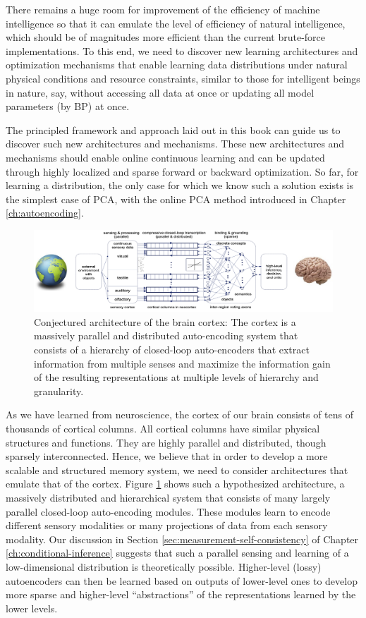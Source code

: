\documentclass[../../book-main.tex]{subfiles}
\begin{document}
There remains a huge room for  improvement of the efficiency of   machine intelligence so that it can emulate the level of efficiency of natural intelligence, which should be of magnitudes more efficient than the current brute-force implementations. To this end, we need to discover new learning architectures and optimization mechanisms that enable learning data distributions under natural physical conditions and resource constraints, similar to those for intelligent beings in nature, say, without accessing all data at once or updating all model parameters (by BP) at once. 

The principled framework and approach laid out in this book can guide us to discover such new architectures and mechanisms.  These new architectures and mechanisms should enable online continuous learning and can be updated through highly localized and sparse forward or backward optimization. So far, for learning a distribution, the only case for which we know such a solution exists is the simplest case of PCA, with the online PCA method introduced in Chapter \ref{ch:autoencoding}.  

\begin{figure}[t]
\centering
\includegraphics[width=0.99\linewidth]{figs_chap8/loops.png}
    \caption{Conjectured architecture of the brain cortex: The cortex is a massively parallel and distributed auto-encoding system that consists of a hierarchy of closed-loop auto-encoders that extract information from multiple senses and maximize the information  gain of the resulting representations at multiple levels of hierarchy and granularity.}
    \label{fig:loops}
\end{figure}
As we have learned from neuroscience, the cortex of our brain consists of tens of thousands of cortical columns. All cortical columns have similar physical structures and functions. They are highly parallel and distributed, though sparsely interconnected. Hence, we believe that in order to develop a more scalable and structured memory system, we need to consider architectures that emulate that of the cortex. Figure \ref{fig:loops} shows such a hypothesized architecture, a massively distributed and hierarchical system that consists of many largely parallel closed-loop auto-encoding modules. These modules learn to encode different sensory modalities or many projections of data from each sensory modality. Our discussion in Section \ref{sec:measurement-self-consistency} of Chapter \ref{ch:conditional-inference} suggests that such a parallel sensing and learning of a low-dimensional distribution is theoretically possible. Higher-level (lossy) autoencoders can then be learned based on outputs of lower-level ones to develop more sparse and higher-level  ``abstractions'' of the representations learned by the lower levels. 
\end{document}
